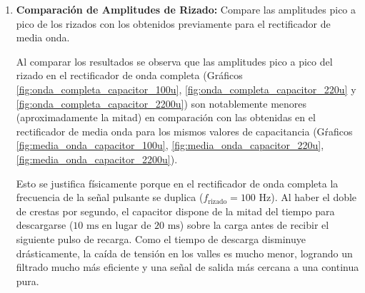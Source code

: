 \begin{enumerate}
    \begin{tcolorbox}[colback=white, colframe=gray!50, title=Respuesta]
        Al aumentar la capacitancia los valores obtenidos con el multímetro fueron:
        \begin{itemize}
            \item Sin capacitor: $\text{9.45 V}$ (resistencia) y $\text{9.21 V}$ (cooler).
            \item Con capacitor de 100 $\mu$F: $\text{11.80 V}$ (resistencia) y $\text{11.00 V}$ (cooler).
            \item Con capacitor de 220 $\mu$F: $\text{12.69 V}$ (resistencia) y $\text{12.05 V}$ (cooler).
            \item Con capacitor de 2200 $\mu$F: $\text{13.18 V}$ (resistencia) y $\text{12.61 V}$ (cooler).
        \end{itemize}
        En comparación con el rectificador de media onda, las tensiones medias obtenidas en el rectificador de onda completa son significativamente más altas para los mismos valores de capacitancia. Esto se debe a que en el rectificador de onda completa, la señal de salida tiene el doble de frecuencia (100 Hz) en comparación con el rectificador de media onda (50 Hz), lo que permite que el capacitor se recargue más frecuentemente y mantenga una tensión más alta.
    \end{tcolorbox}

    \item \textbf{Comparación de Amplitudes de Rizado:}
    Compare las amplitudes pico a pico de los rizados con los obtenidos previamente para el rectificador de media onda.
    
    \begin{tcolorbox}[colback=white, colframe=gray!50, title=Respuesta]
        Al comparar los resultados se observa que las amplitudes pico a pico del rizado en el rectificador de onda completa (Gráficos \ref{fig:onda_completa_capacitor_100u}, \ref{fig:onda_completa_capacitor_220u} y \ref{fig:onda_completa_capacitor_2200u}) son notablemente menores (aproximadamente la mitad) en comparación con las obtenidas en el rectificador de media onda para los mismos valores de capacitancia (Gŕaficos \ref{fig:media_onda_capacitor_100u}, \ref{fig:media_onda_capacitor_220u}, \ref{fig:media_onda_capacitor_2200u}).
        
        Esto se justifica físicamente porque en el rectificador de onda completa la frecuencia de la señal pulsante se duplica ($f_{\text{rizado}} = 100\text{ Hz}$). Al haber el doble de crestas por segundo, el capacitor dispone de la mitad del tiempo para descargarse ($10\text{ ms}$ en lugar de $20\text{ ms}$) sobre la carga antes de recibir el siguiente pulso de recarga. Como el tiempo de descarga disminuye drásticamente, la caída de tensión en los valles es mucho menor, logrando un filtrado mucho más eficiente y una señal de salida más cercana a una continua pura.
    \end{tcolorbox}


\end{enumerate}
